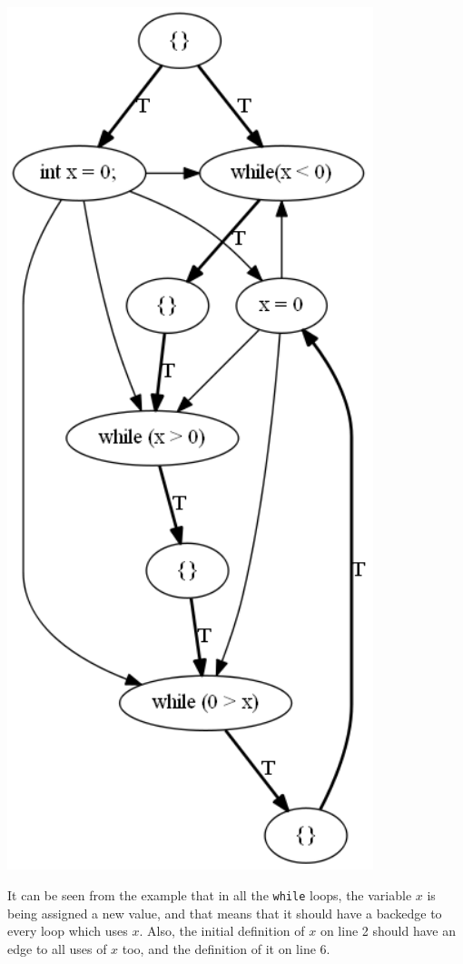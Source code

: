 \documentclass[oneside,12pt,a4paper]{book}
\begin{document}
\begin{minipage}[c]{0.5\textwidth}
\centering
\includegraphics[width=0.8\textwidth]{while_while_while.png}
\end{minipage}
\clearpage


It can be seen from the example that in all the \texttt{while} loops, the variable $x$ is being assigned a new value, and that means that it should have a backedge to every loop which uses $x$. Also, the initial definition of $x$ on line 2 should have an edge to all uses of $x$ too, and the definition of it on line 6.
\end{document}
